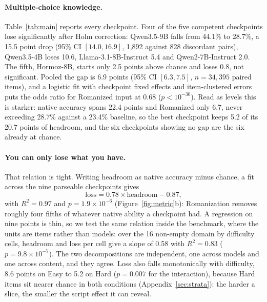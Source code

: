 \documentclass[11pt]{article}
\begin{document}
\paragraph{Multiple-choice knowledge.}
Table~\ref{tab:main} reports every checkpoint. Four of the five competent checkpoints lose
significantly after Holm correction: Qwen3.5-9B falls from 44.1\% to 28.7\%, a 15.5 point
drop (95\% CI $[14.0, 16.9]$, 1{,}892 against 828 discordant pairs), Qwen3.5-4B loses
10.6, Llama-3.1-8B-Instruct 5.4 and Qwen2-7B-Instruct 2.0. The fifth, Hormoz-8B, starts
only 2.5 points above chance and loses 0.8, not significant. Pooled the gap is 6.9 points
(95\% CI $[6.3, 7.5]$, $n = 34{,}395$ paired items), and a logistic fit with checkpoint
fixed effects and item-clustered errors puts the odds ratio for Romanized input at 0.68
($p < 10^{-30}$). Read as levels this is starker: native accuracy spans 22.4 points and
Romanized only 6.7, never exceeding 28.7\% against a 23.4\% baseline, so the best
checkpoint keeps 5.2 of its 20.7 points of headroom, and the six checkpoints showing no
gap are the six already at chance.

\paragraph{You can only lose what you have.}
That relation is tight. Writing headroom as native accuracy minus chance, a fit across
the nine parseable checkpoints gives
\begin{equation}
\text{loss} = 0.78 \times \text{headroom} - 0.87,
\label{eq:law}
\end{equation}
with $R^2 = 0.97$ and $p = 1.9 \times 10^{-6}$ (Figure~\ref{fig:metric}b): Romanization
removes roughly four fifths of whatever native ability a checkpoint had. A regression on
nine points is thin, so we test the same relation inside the benchmark, where the units are
items rather than models: over the 16 non-empty domain by difficulty cells, headroom and
loss per cell give a slope of 0.58 with $R^2 = 0.83$ ($p = 9.8 \times 10^{-7}$). The two decompositions are independent, one across models and one
across content, and they agree. Loss also falls monotonically with difficulty, 8.6 points
on Easy to 5.2 on Hard ($p = 0.007$ for the interaction), because Hard items sit nearer
chance in both conditions (Appendix~\ref{sec:strata}): the harder a slice, the smaller the
script effect it can reveal.
\end{document}
